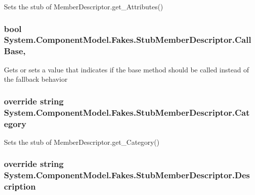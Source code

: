 Sets the stub of Member\-Descriptor.\-get\-\_\-\-Attributes()

\hypertarget{class_system_1_1_component_model_1_1_fakes_1_1_stub_member_descriptor_acd1a01e262b18af16b5a6ea4a8eeaa3d}{
\subsubsection[{Call\-Base}]{\setlength{\rightskip}{0pt plus 5cm}bool System.\-Component\-Model.\-Fakes.\-Stub\-Member\-Descriptor.\-Call\-Base\hspace{0.3cm}{\ttfamily [get]}, {\ttfamily [set]}}}\label{class_system_1_1_component_model_1_1_fakes_1_1_stub_member_descriptor_acd1a01e262b18af16b5a6ea4a8eeaa3d}


Gets or sets a value that indicates if the base method should be called instead of the fallback behavior

\hypertarget{class_system_1_1_component_model_1_1_fakes_1_1_stub_member_descriptor_aa656937185623d957b6e6be6cf4abdee}{
\subsubsection[{Category}]{\setlength{\rightskip}{0pt plus 5cm}override string System.\-Component\-Model.\-Fakes.\-Stub\-Member\-Descriptor.\-Category\hspace{0.3cm}{\ttfamily [get]}}}\label{class_system_1_1_component_model_1_1_fakes_1_1_stub_member_descriptor_aa656937185623d957b6e6be6cf4abdee}


Sets the stub of Member\-Descriptor.\-get\-\_\-\-Category()

\hypertarget{class_system_1_1_component_model_1_1_fakes_1_1_stub_member_descriptor_a1f423b4b6caa499543c99a31bd9986f9}{
\subsubsection[{Description}]{\setlength{\rightskip}{0pt plus 5cm}override string System.\-Component\-Model.\-Fakes.\-Stub\-Member\-Descriptor.\-Description\hspace{0.3cm}{\ttfamily [get]}}}\label{class_system_1_1_component_model_1_1_fakes_1_1_stub_member_descriptor_a1f423b4b6caa499543c99a31bd9986f9}


